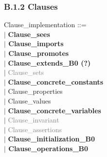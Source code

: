 \documentclass[12pt,a4paper,draft]{article}
\begin{document}
\subsubsection{B.1.2 Clauses}
\footnotesize{
\begin{sloppypar} 

Clause\_implementation ::=\\
\hspace*{0.20in} $|$ \textbf{Clause\_sees\\
\hspace*{0.20in} $|$ Clause\_imports\\
\hspace*{0.20in} $|$ Clause\_promotes}\\
\hspace*{0.20in} $|$ \textbf{Clause\_extends\_B0 (?)}\\
\hspace*{0.20in} $|$ \textcolor{gray}{Clause\_sets}\\
\hspace*{0.20in} $|$ \textbf{Clause\_concrete\_constants}\\
\hspace*{0.20in} $|$ Clause\_properties\\
\hspace*{0.20in} $|$ Clause\_values\\
\hspace*{0.20in} $|$ \textbf{Clause\_concrete\_variables}\\
\hspace*{0.20in} $|$ \textcolor{gray}{Clause\_invariant}\\
\hspace*{0.20in} $|$ \textcolor{gray}{Clause\_assertions}\\
\hspace*{0.20in} $|$ \textbf{Clause\_initialization\_B0\\
\hspace*{0.20in} $|$ Clause\_operations\_B0}\\
\end{sloppypar}}
\end{document}
